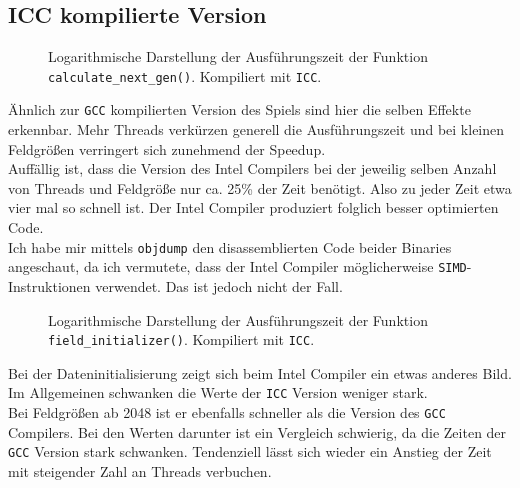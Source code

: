 \documentclass[german,plainarticle,hyperref,utf8]{zihpub}
\begin{document}
	\subsection{ICC kompilierte Version}
	\begin{figure}[h]
		\begin{center}
			
		\end{center}
		\caption{Logarithmische Darstellung der Ausführungszeit der Funktion \texttt{calculate\_next\_gen()}. Kompiliert mit \texttt{ICC}.}
	\end{figure}
	Ähnlich zur \texttt{GCC} kompilierten Version des Spiels sind hier die selben Effekte erkennbar. Mehr Threads verkürzen generell die Ausführungszeit und bei kleinen Feldgrößen verringert sich zunehmend der Speedup.\\
	Auffällig ist, dass die Version des Intel Compilers bei der jeweilig selben Anzahl von Threads und Feldgröße nur ca. 25\% der Zeit benötigt. Also zu jeder Zeit etwa vier mal so schnell ist. Der Intel Compiler produziert folglich besser optimierten Code.\\
	Ich habe mir mittels \texttt{objdump} den disassemblierten Code beider Binaries angeschaut, da ich vermutete, dass der Intel Compiler möglicherweise \texttt{SIMD}-Instruktionen verwendet. Das ist jedoch nicht der Fall.
	\newpage
	\begin{figure}[h]
		\begin{center}
			
		\end{center}
		\caption{Logarithmische Darstellung der Ausführungszeit der Funktion \texttt{field\_initializer()}. Kompiliert mit \texttt{ICC}.}
	\end{figure}
	Bei der Dateninitialisierung zeigt sich beim Intel Compiler ein etwas anderes Bild. Im Allgemeinen schwanken die Werte der \texttt{ICC} Version weniger stark.\\
	Bei Feldgrößen ab 2048 ist er ebenfalls schneller als die Version des \texttt{GCC} Compilers. Bei den Werten darunter ist ein Vergleich schwierig, da die Zeiten der \texttt{GCC} Version stark schwanken. Tendenziell lässt sich wieder ein Anstieg der Zeit mit steigender Zahl an Threads verbuchen.
	\newpage
\end{document}
